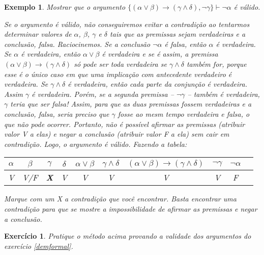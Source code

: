\documentclass[a4paper,10pt]{article}
\newtheorem{exrcc}{Exercício}[subsection] %
\newtheorem{exmpl}{Exemplo}[subsection] %
\begin{document}
\begin{exmpl}
Mostrar que o argumento $\{(\alpha\vee\beta)\rightarrow(\gamma\wedge\delta), 
\neg\gamma\}\vdash\neg\alpha$ é válido.

Se o argumento é válido, não conseguiremos evitar a contradição ao tentarmos determinar
valores de $\alpha$, $\beta$, $\gamma$ e $\delta$ tais que as premissas sejam
verdadeiras e a conclusão, falsa. Raciocinemos. Se a conclusão $\neg\alpha$
é falsa, então $\alpha$ é verdadeira. Se $\alpha$ é verdadeira, então $\alpha\vee\beta$
é verdadeira e se é assim, a premissa
$(\alpha\vee\beta)\rightarrow(\gamma\wedge\delta)$ só pode ser toda verdadeira se
$\gamma\wedge\delta$ também for, porque esse é o único caso em que uma implicação com
antecedente verdadeiro é verdadeira. Se $\gamma\wedge\delta$ é verdadeira, então cada
parte da conjunção é verdadeira. Assim $\gamma$
é verdadeira. Porém, se a segunda premissa -- $\neg\gamma$ -- também é verdadeira,
$\gamma$ teria que ser falsa! Assim, para que as duas premissas fossem verdadeiras e a
conclusão, falsa, seria preciso que $\gamma$ fosse ao mesm tempo verdadeira e falsa, o
que não pode ocorrer. Portanto, não é possível afirmar as premissas (atribuir valor V a
elas) e negar a conclusão (atribuir valor F a ela) sem cair em contradição. Logo, o
argumento é válido. Fazendo a tabela:

\begin{center}
\begin{tabular}[c]{cccccccccc}
$\alpha$ & $\beta$ & $\gamma$ & $\delta$ & $\alpha\vee\beta$ & $\gamma\wedge\delta$ &
$(\alpha\vee\beta)\rightarrow(\gamma\wedge\delta)$ & $\neg\gamma$ & $\neg\alpha$ \\
\hline
V	& V/F	&	{\upshape\textbf{X}}	&	V	&	V	&
V & V & V	&	F
 
\end{tabular}
\end{center}

Marque com um X a contradição que você encontrar. Basta encontrar uma contradição para
que se mostre a impossibilidade de afirmar as premissas e negar a conclusão. 
 
\end{exmpl}

\begin{exrcc}
 Pratique o método acima provando a validade dos argumentos do exercício
\ref{demformal}. 
\end{exrcc}
\end{document}
